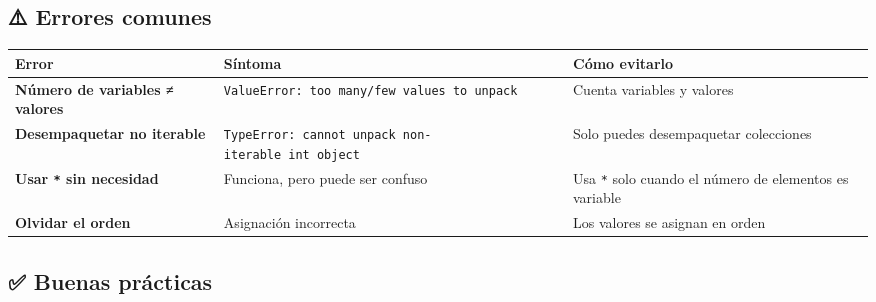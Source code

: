 \documentclass[
  doc,
  floatsintext,
  longtable,
  a4paper,
  nolmodern,
  notxfonts,
  notimes,
  12pt,
  colorlinks=true,linkcolor=blue,citecolor=blue,urlcolor=blue]{apa7}
\newcounter{none} %
\begin{document}
\subsection{⚠️ Errores comunes}\label{errores-comunes}

{\def\LTcaptype{none} %
\begin{longtable}[]{@{}
  >{\raggedright\arraybackslash}p{}
  >{\raggedright\arraybackslash}p{}
  >{\raggedright\arraybackslash}p{}@{}}
\toprule\noalign{}
\begin{minipage}[b]{\linewidth}\raggedright
Error
\end{minipage} & \begin{minipage}[b]{\linewidth}\raggedright
Síntoma
\end{minipage} & \begin{minipage}[b]{\linewidth}\raggedright
Cómo evitarlo
\end{minipage} \\
\midrule\noalign{}
\endhead
\bottomrule\noalign{}
\endlastfoot
\textbf{Número de variables ≠ valores} &
\texttt{ValueError:\ too\ many/few\ values\ to\ unpack} & Cuenta
variables y valores \\
\textbf{Desempaquetar no iterable} &
\texttt{TypeError:\ cannot\ unpack\ non-iterable\ int\ object} & Solo
puedes desempaquetar colecciones \\
\textbf{Usar \texttt{*} sin necesidad} & Funciona, pero puede ser
confuso & Usa \texttt{*} solo cuando el número de elementos es
variable \\
\textbf{Olvidar el orden} & Asignación incorrecta & Los valores se
asignan en orden \\
\end{longtable}
}

\subsection{✅ Buenas prácticas}\label{buenas-pruxe1cticas}
\end{document}
